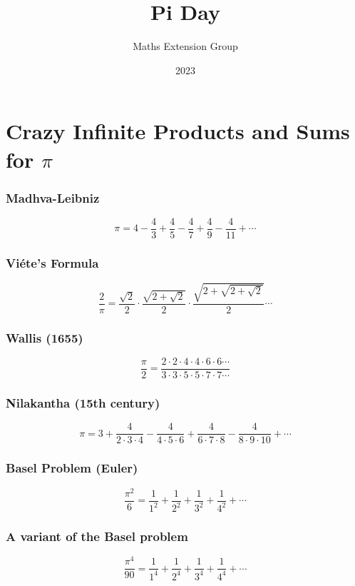 \documentclass{beamer}
\title{Pi Day}
\author{Maths Extension Group}
\institute{Melbourne High School}
\date{2023}
\begin{document}
\frame{\titlepage}
\section{Crazy Infinite Products and Sums for \(\pi\)}
\begin{frame}
\frametitle{Madhva-Leibniz}
\[
\pi=4-\frac{4}{3}+\frac{4}{5}-\frac{4}{7}+\frac{4}{9}-\frac{4}{11}+\cdots
\]
\end{frame}
\begin{frame}
\frametitle{Vi\'ete's Formula}
\[
\frac{2}{\pi}=\frac{\sqrt{2}}{2}\cdot\frac{\sqrt{2+\sqrt{2}}}{2}\cdot\frac{\sqrt{2+\sqrt{2+\sqrt{2}}}}{2}\cdots
\]
\end{frame}
\begin{frame}
\frametitle{Wallis (1655)}
\[
\frac{\pi}{2}=\frac{2\cdot2\cdot4\cdot4\cdot6\cdot6\cdots}{3\cdot3\cdot5\cdot5\cdot7\cdot7\cdots}
\]
\end{frame}
\begin{frame}
  \frametitle{Nilakantha (15th century)}
  \[
    \pi=3+\frac{4}{2\cdot3\cdot4}-\frac{4}{4\cdot5\cdot6}+\frac{4}{6\cdot7\cdot8}-\frac{4}{8\cdot9\cdot10}+\cdots
  \]
\end{frame}
\begin{frame}
  \frametitle{Basel Problem (Euler)}
  \[\frac{\pi^2}{6}=\frac{1}{1^2}+\frac{1}{2^2}+\frac{1}{3^2}+\frac{1}{4^2}+\cdots\]
\end{frame}
\begin{frame}
  \frametitle{A variant of the Basel problem}
  \[\frac{\pi^4}{90}=\frac{1}{1^4}+\frac{1}{2^4}+\frac{1}{3^4}+\frac{1}{4^4}+\cdots\]
\end{frame}
\end{document}
